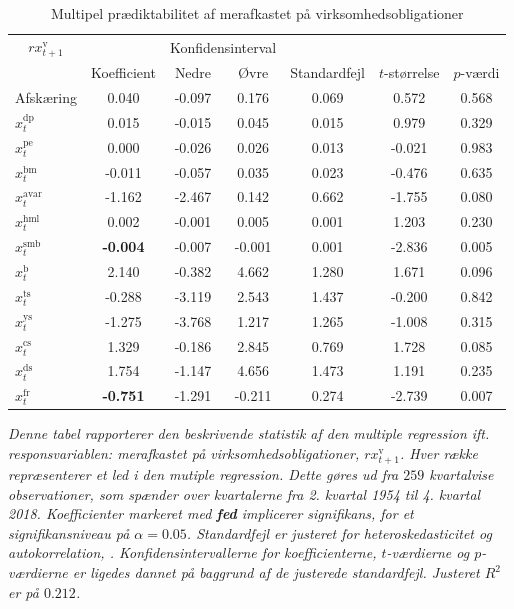 \documentclass[
  a4paper,
  oneside]{memoir}
\begin{document}
\begin{table}[H]

\caption{\label{tab:MULT-v}Multipel prædiktabilitet af merafkastet på virksomhedsobligationer}
\centering
\begin{threeparttable}
\begin{tabular}[t]{lcccccc}
\toprule
\multicolumn{1}{c}{$rx_{t+1}^{\text{v}}$} & \multicolumn{1}{c}{ } & \multicolumn{2}{c}{Konfidensinterval} & \multicolumn{3}{c}{ } \\
\cmidrule(l{3pt}r{3pt}){1-1} \cmidrule(l{3pt}r{3pt}){3-4}
  & Koefficient & Nedre & Øvre & Standardfejl & $t$-størrelse & $p$-værdi\\
\midrule
\rowcolor{gray!6}  Afskæring & 0.040 & -0.097 & 0.176 & 0.069 & 0.572 & 0.568\\
$x_t^{\text{dp}}$ & 0.015 & -0.015 & 0.045 & 0.015 & 0.979 & 0.329\\
\rowcolor{gray!6}  $x_t^{\text{pe}}$ & 0.000 & -0.026 & 0.026 & 0.013 & -0.021 & 0.983\\
$x_t^{\text{bm}}$ & -0.011 & -0.057 & 0.035 & 0.023 & -0.476 & 0.635\\
\rowcolor{gray!6}  $x_t^{\text{avar}}$ & -1.162 & -2.467 & 0.142 & 0.662 & -1.755 & 0.080\\
$x_t^{\text{hml}}$ & 0.002 & -0.001 & 0.005 & 0.001 & 1.203 & 0.230\\
\rowcolor{gray!6}  $x_t^{\text{smb}}$ & \textbf{-0.004} & -0.007 & -0.001 & 0.001 & -2.836 & 0.005\\
$x_t^{\text{b}}$ & 2.140 & -0.382 & 4.662 & 1.280 & 1.671 & 0.096\\
\rowcolor{gray!6}  $x_t^{\text{ts}}$ & -0.288 & -3.119 & 2.543 & 1.437 & -0.200 & 0.842\\
$x_t^{\text{ys}}$ & -1.275 & -3.768 & 1.217 & 1.265 & -1.008 & 0.315\\
\rowcolor{gray!6}  $x_t^{\text{cs}}$ & 1.329 & -0.186 & 2.845 & 0.769 & 1.728 & 0.085\\
$x_t^{\text{ds}}$ & 1.754 & -1.147 & 4.656 & 1.473 & 1.191 & 0.235\\
\rowcolor{gray!6}  $x_t^{\text{fr}}$ & \textbf{-0.751} & -1.291 & -0.211 & 0.274 & -2.739 & 0.007\\
\bottomrule
\end{tabular}
\begin{tablenotes}
\item \textit{Denne tabel rapporterer den beskrivende statistik af den multiple regression ift. responsvariablen: merafkastet på virksomhedsobligationer, $rx_{t+1}^{\text{v}}$. Hver række repræsenterer et led i den mutiple regression. Dette gøres ud fra $259$ kvartalvise observationer, som spænder over kvartalerne fra 2. kvartal 1954 til 4. kvartal 2018. Koefficienter markeret med \textbf{fed} implicerer signifikans, for et signifikansniveau på $\alpha=0.05$. Standardfejl er justeret for heteroskedasticitet og autokorrelation, \citep{Newey1987}. Konfidensintervallerne for koefficienterne, $t$-værdierne og $p$-værdierne er ligedes dannet på baggrund af de justerede standardfejl. Justeret $R^2$ er på $0.212$.}
\end{tablenotes}
\end{threeparttable}
\end{table}
\end{document}
